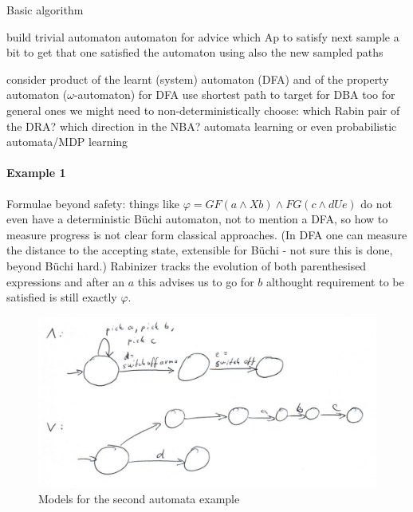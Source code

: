 \documentclass{article}
\begin{document}
\begin{algorithm}
	\caption{Basic algorithm}\label{alg:general}
	\begin{algorithmic}[1]
		\State build trivial automaton
		\Repeat{}
		\Repeat{}
		\State {} automaton for advice which Ap to satisfy next
		\State sample a bit to get that one satisfied
		\State {} the automaton using also the new sampled paths
		
		\State consider product of the learnt (system) automaton (DFA) and of the property automaton ($\omega$-automaton)
		\State for DFA use shortest path to target
		\State for DBA too
		\State for general ones we might need to non-deterministically choose: which Rabin pair of the DRA? which direction in the NBA?
		\EndProcedure
		\State automata learning or even probabilistic automata/MDP learning
		\EndProcedure
	\end{algorithmic}
\end{algorithm}



\paragraph{Example 1}
Formulae beyond safety: things like $\varphi=GF(a\wedge Xb)\wedge FG(c\wedge dUe)$ do not even have a deterministic B\"uchi automaton, not to mention a DFA, so how to measure progress is not clear form classical approaches. 
(In DFA one can measure the distance to the accepting state, extensible for B\"uchi - not sure this is done, beyond B\"uchi hard.)
Rabinizer tracks the evolution of both parenthesised expressions and after an $a$ this advises us to go for $b$ althought requirement to be satisfied is still exactly $\varphi$.

\begin{figure}[h]
	\includegraphics[scale=0.4]{Fig/auto}\caption{Models for the second automata example}
\end{figure}
\end{document}
